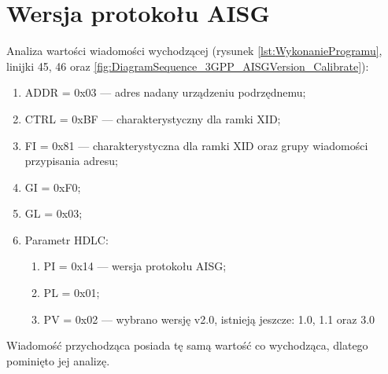 
\section{Wersja protokołu AISG}
Analiza wartości wiadomości wychodzącej 
(rysunek \ref{lst:WykonanieProgramu}, linijki {45, 46} oraz \ref{fig:DiagramSequence_3GPP_AISGVersion_Calibrate}):
\begin{enumerate}
    \item ADDR = 0x03 --- adres nadany urządzeniu podrzędnemu;
    \item CTRL = 0xBF --- charakterystyczny dla ramki XID;
    \item FI = 0x81 --- charakterystyczna dla ramki XID oraz grupy wiadomości przypisania adresu;
    \item GI = 0xF0;
    \item GL = 0x03;
    \item Parametr HDLC:
    \begin{enumerate}
        \item PI = 0x14 --- wersja protokołu AISG;
        \item PL = 0x01;
        \item PV = 0x02 --- wybrano wersję v2.0, istnieją jeszcze: 1.0, 1.1 oraz 3.0
    \end{enumerate}
\end{enumerate}
Wiadomość przychodząca posiada tę samą wartość co wychodząca, dlatego pominięto jej analizę.

